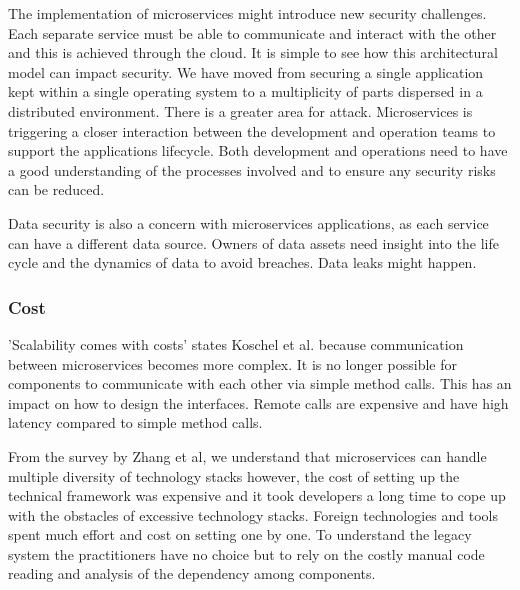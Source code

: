 The implementation of microservices might introduce new security challenges. Each separate service must be able to communicate and interact with the other and this is achieved through the cloud. It is simple to see how this architectural model can impact security. We have moved from securing a single application kept within a single operating system to a multiplicity of parts dispersed in a distributed environment. There is a greater area for attack.\cite{Zaytev2018} Microservices is triggering a closer interaction between the development and operation teams to support the applications lifecycle. Both development and operations need to have a good understanding of the processes involved and to ensure any security risks can be reduced.\cite{Aaron2018,Amazon,Gonchar2017}

Data security is also a concern with microservices applications, as each service can have a different data source. Owners of data assets need insight into the life cycle and the dynamics of data to avoid breaches. Data leaks might happen.\cite{tenev2019}


\subsubsection{Cost}%
'Scalability comes with costs' states Koschel et al.\cite{Koschel2017}  because communication between microservices becomes more complex. It is no longer possible for components to communicate with each other via simple method calls. %
This has an impact on how to design the interfaces. 
Remote calls are expensive and have high latency compared to simple method calls.\cite{Koschel2017, McElhiney2018}

From the survey by Zhang et al,\cite{Zhang2019} we understand that microservices can handle multiple diversity of technology stacks however, the cost of setting up the technical framework was expensive and it took developers a long time to cope up with the obstacles of excessive technology stacks. Foreign technologies and tools spent much effort and cost on setting one by one. To understand the legacy system the practitioners have no choice but to rely on the costly manual code reading and analysis of the dependency among components.

